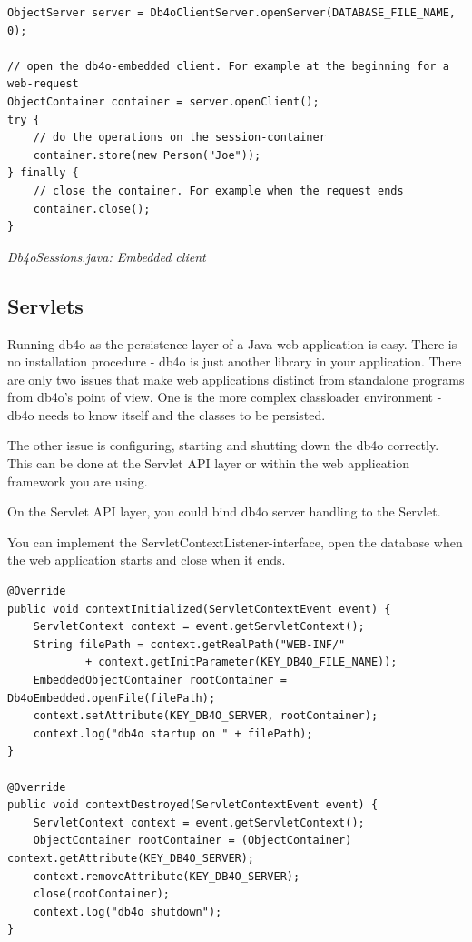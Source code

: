 \begin{lstlisting}
ObjectServer server = Db4oClientServer.openServer(DATABASE_FILE_NAME, 0);

// open the db4o-embedded client. For example at the beginning for a web-request
ObjectContainer container = server.openClient();
try {
    // do the operations on the session-container
    container.store(new Person("Joe"));
} finally {
    // close the container. For example when the request ends
    container.close();
}
\end{lstlisting}

{\small\itshape Db4oSessions.java: Embedded client\par}
\medskip

\subsection{Servlets}
\label{ref:platform-specific-issues-web-servlets}

Running db4o as the persistence layer of a Java web application is easy. There is no installation procedure - db4o is just another library in your application. There are only two issues that make web applications distinct from standalone programs from db4o's point of view. One is the more complex classloader environment - db4o needs to know itself and the classes to be persisted.

The other issue is configuring, starting and shutting down the db4o correctly. This can be done at the Servlet API layer or within the web application framework you are using.

On the Servlet API layer, you could bind db4o server handling to the Servlet.

You can implement the ServletContextListener-interface, open the database when the web application starts and close when it ends.

\begin{lstlisting}
@Override
public void contextInitialized(ServletContextEvent event) {
    ServletContext context = event.getServletContext();
    String filePath = context.getRealPath("WEB-INF/"
            + context.getInitParameter(KEY_DB4O_FILE_NAME));
    EmbeddedObjectContainer rootContainer = Db4oEmbedded.openFile(filePath);
    context.setAttribute(KEY_DB4O_SERVER, rootContainer);
    context.log("db4o startup on " + filePath);
}

@Override
public void contextDestroyed(ServletContextEvent event) {
    ServletContext context = event.getServletContext();
    ObjectContainer rootContainer = (ObjectContainer) context.getAttribute(KEY_DB4O_SERVER);
    context.removeAttribute(KEY_DB4O_SERVER);
    close(rootContainer);
    context.log("db4o shutdown");
}
\end{lstlisting}

